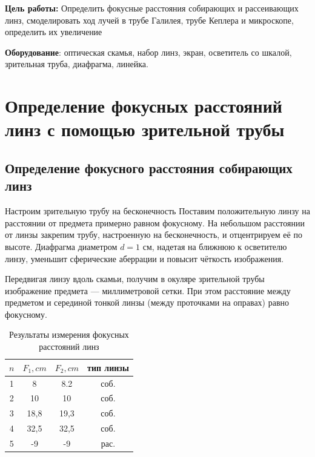 






\textbf{Цель работы:}
Определить фокусные расстояния собирающих и рассеивающих линз, смоделировать ход лучей в трубе Галилея, трубе Кеплера и микроскопе, определить их увеличение

\textbf{Оборудование}: оптическая скамья, набор линз, экран, осветитель со шкалой, 
зрительная труба, диафрагма, линейка.



\section{Определение фокусных расстояний линз с помощью зрительной трубы}
\subsection{Определение фокусного расстояния собирающих линз}


Настроим зрительную трубу на бесконечность
Поставим положительную линзу на расстоянии от предмета примерно равном фокусному. На небольшом расстоянии от линзы закрепим трубу, настроенную на бесконечность,
и отцентрируем её по высоте. Диафрагма диаметром $d = 1$ см, надетая на ближнюю к осветителю линзу, уменьшит сферические аберрации и повысит чёткость изображения.

Передвигая линзу вдоль скамьи, получим в окуляре зрительной трубы изображение предмета — миллиметровой сетки. При этом расстояние между предметом и серединой тонкой линзы (между проточками на оправах) равно фокусному.

    \begin{table}[h!]
        \centering
            \begin{tabular}{| c | c | c | c |}

                \hline
                    $n$ & $F_1, cm$ & $F_2, cm$ &  тип линзы\\
                \hline
                    1 & 8 & 8.2 & соб. \\
                \hline
                    2 & 10 & 10 & соб.\\
                \hline
                    3 & 18,8 & 19,3  & соб. \\
                \hline
                    4 & 32,5 & 32,5 & соб. \\
                \hline
                    5 & -9 & -9 &  рас.\\
                \hline
                \end{tabular}
        \caption{Результаты измерения фокусных расстояний линз}
        \label{nu1}
    \end{table}
    

